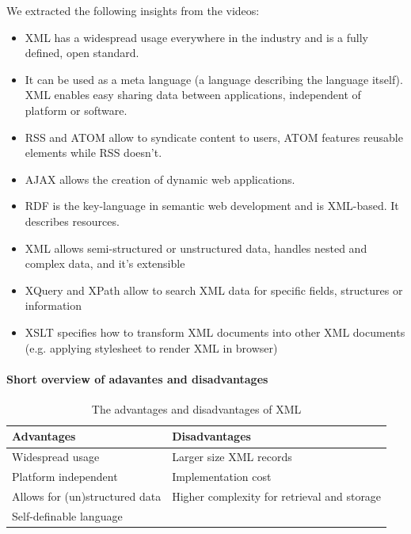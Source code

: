 We extracted the following insights from the videos: 
\begin{itemize}
\item
XML has a widespread usage everywhere in the industry and is a fully defined, open standard.
\item
It can be used as a meta language (a language describing the language itself).
XML enables easy sharing data between applications, independent of platform or software.
\item
RSS and ATOM allow to syndicate content to users, ATOM features reusable elements while RSS doesn't.
\item
AJAX allows the creation of dynamic web applications.
\item
RDF is the key-language in semantic web development and is XML-based. It describes resources.
\item
XML allows semi-structured or unstructured data, handles nested and complex data, and it's extensible
\item
XQuery and XPath allow to search XML data for specific fields, structures or information
\item
XSLT specifies how to transform XML documents into other XML documents (e.g. applying stylesheet to render XML in browser)
\end{itemize}

\paragraph{Short overview of adavantes and disadvantages}
\mbox{}

\begin{table}[h]
\begin{tabular}{|l|l|}
\hline
	\textbf{\color{OliveGreen}Advantages} & \textbf{\color{Maroon}Disadvantages} \\
	\hline
	Widespread usage & Larger size XML records \\
	Platform independent & Implementation cost \\
	Allows for (un)structured data & Higher complexity for retrieval and storage \\
	Self-definable language & \\
\hline
\end{tabular}
\caption{The advantages and disadvantages of XML}
\label{tab:XmlProsCons}
\end{table}


